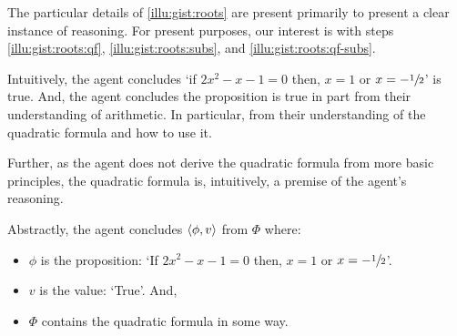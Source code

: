 \begin{note}
  The particular details of \autoref{illu:gist:roots} are present primarily to present a clear instance of reasoning.
  For present purposes, our interest is with steps \ref{illu:gist:roots:qf}, \ref{illu:gist:roots:subs}, and \ref{illu:gist:roots:qf-subs}.

  Intuitively, the agent concludes `if \(2x^{2} - x - 1 = 0\) then, \(x = 1\) or \(x = -\sfrac{1}{2}\)' is true.
  And, the agent concludes the proposition is true in part from their understanding of arithmetic.
  In particular, from their understanding of the quadratic formula and how to use it.

  Further, as the agent does not derive the quadratic formula from more basic principles, the quadratic formula is, intuitively, a premise of the agent's reasoning.

  Abstractly, the agent concludes \(\langle \phi, v \rangle\) from \(\Phi\) where:
  \begin{itemize}[noitemsep]
  \item
    \(\phi\) is the proposition: `If \(2x^{2} - x - 1 = 0\) then, \(x = 1\) or \(x = -\sfrac{1}{2}\)'.
  \item
    \(v\) is the value: `True'.
    And,
  \item
    \(\Phi\) contains the quadratic formula in some way.
  \end{itemize}
\end{note}

